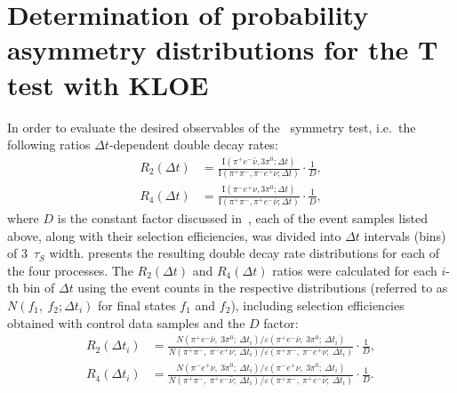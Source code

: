 \section{Determination of probability asymmetry distributions for the T test with KLOE}\label{sec:ratios}
In order to evaluate the desired observables of the \Ts~symmetry test, i.e.\ the following ratios $\Delta t$-dependent double decay rates:
\begin{eqnarray}
  \label{eq:final_r2_and_r4}
  R_2(\Delta t) &= \frac{\mathrm{I}(\pi^+e^-\bar{\nu},3\pi^0;\Delta t)}{\mathrm{I}(\pi^+\pi^-,\pi^-e^+\nu;\Delta t)} \cdot \frac{1}{D},\\
  {R_4(\Delta t)} & = \frac{\mathrm{I}(\pi^-e^+\nu,3\pi^0;\Delta t)}{\mathrm{I}(\pi^+\pi^-,\pi^+e^-\bar{\nu};\Delta t)}  \cdot \frac{1}{D},
\end{eqnarray}
where $D$ is the constant factor discussed in~, each of the event samples listed above, along with their selection efficiencies, was divided into $\Delta t$ intervals (bins) of 3~$\tau_{S}$ width.
 presents the resulting double decay rate distributions for each of the four processes. The $R_2(\Delta t)$ and $R_4(\Delta t)$ ratios were calculated for each $i$-th bin of $\Delta t$ using the event counts in the respective distributions (referred to as $N(f_1,\:f_2;\Delta t_i)$ for final states $f_1$ and $f_2$), including selection efficiencies obtained with control data samples and the $D$ factor:
\begin{eqnarray}
  \label{eq:r2_and_r4_bin_value}
  R_{2}(\Delta t_i) &= \frac{N(\pi^+ e^-\bar{\nu},\:3\pi^0;\:\Delta t_i) / \varepsilon(\pi^+ e^-\bar{\nu},\:3\pi^0;\:\Delta t_i)}{N(\pi^+\pi^-,\:\pi^-e^+\nu;\:\Delta t_i) / \varepsilon(\pi^+\pi^-,\:\pi^-e^+\nu;\:\Delta t_i)}  \cdot \frac{1}{D},\\
  R_{4}(\Delta t_i) &= \frac{N(\pi^- e^+{\nu},\:3\pi^0;\:\Delta t_i) / \varepsilon(\pi^- e^+{\nu},\:3\pi^0;\:\Delta t_i)}{N(\pi^+\pi^-,\:\pi^+e^-\bar{\nu};\:\Delta t_i) / \varepsilon(\pi^+\pi^-,\:\pi^+ e^-\bar{\nu};\:\Delta t_i)}  \cdot \frac{1}{D}.
\end{eqnarray}

